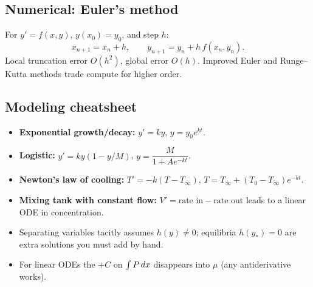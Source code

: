 \subsection{Numerical: Euler's method}
For $y' = f(x, y)$, $y(x_0) = y_0$, and step $h$:
\[ x_{n+1} = x_n + h, \qquad y_{n+1} = y_n + h \, f(x_n, y_n). \]
Local truncation error $O(h^2)$, global error $O(h)$. Improved Euler and Runge--Kutta methods
trade compute for higher order.

\subsection{Modeling cheatsheet}
\begin{keybox}[Recipes]
\begin{itemize}[leftmargin=*,nosep]
  \item \textbf{Exponential growth/decay:} $y' = ky$, $y = y_0 e^{kt}$.
  \item \textbf{Logistic:} $y' = ky(1 - y/M)$, $y = \dfrac{M}{1 + A e^{-kt}}$.
  \item \textbf{Newton's law of cooling:} $T' = -k(T - T_\infty)$, $T = T_\infty + (T_0 - T_\infty) e^{-kt}$.
  \item \textbf{Mixing tank with constant flow:} $V' = \text{rate in} - \text{rate out}$ leads to a linear ODE in concentration.
\end{itemize}
\end{keybox}

\begin{pitfallbox}
\begin{itemize}[leftmargin=*,nosep]
  \item Separating variables tacitly assumes $h(y) \neq 0$; equilibria $h(y_*) = 0$ are extra
        solutions you must add by hand.
  \item For linear ODEs the $+C$ on $\int P \,dx$ disappears into $\mu$ (any antiderivative works).
\end{itemize}
\end{pitfallbox}
